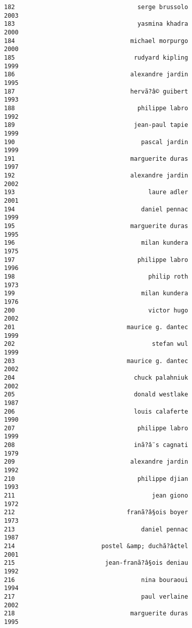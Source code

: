\documentclass[
]{report}
\begin{document}
\begin{verbatim}
182                                  serge brussolo                2003
183                                  yasmina khadra                2000
184                                michael morpurgo                2000
185                                 rudyard kipling                1999
186                                alexandre jardin                1995
187                                hervã?â© guibert                1993
188                                  philippe labro                1992
189                                 jean-paul tapie                1999
190                                   pascal jardin                1999
191                                marguerite duras                1997
192                                alexandre jardin                2002
193                                     laure adler                2001
194                                   daniel pennac                1999
195                                marguerite duras                1995
196                                   milan kundera                1975
197                                  philippe labro                1996
198                                     philip roth                1973
199                                   milan kundera                1976
200                                     victor hugo                2002
201                               maurice g. dantec                1999
202                                      stefan wul                1999
203                               maurice g. dantec                2002
204                                 chuck palahniuk                2002
205                                 donald westlake                1987
206                                 louis calaferte                1990
207                                  philippe labro                1999
208                                 inã?â¨s cagnati                1979
209                                alexandre jardin                1992
210                                  philippe djian                1993
211                                      jean giono                1972
212                               franã?â§ois boyer                1973
213                                   daniel pennac                1987
214                        postel &amp; duchã?â¢tel                2001
215                         jean-franã?â§ois deniau                1992
216                                   nina bouraoui                1994
217                                   paul verlaine                2002
218                                marguerite duras                1995

\end{verbatim}
\end{document}
